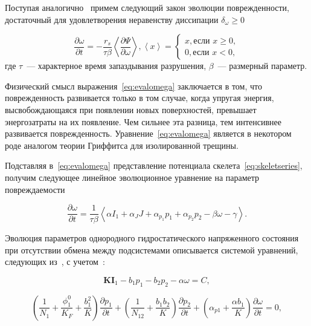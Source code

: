 Поступая аналогично~\autocite{kondaurov2007, izvekov2009, izvekov2010} примем следующий закон эволюции поврежденности, достаточный для удовлетворения неравенству диссипации $\delta_{\omega} \geq 0$

\begin{equation}
  \label{eq:evalomega}
  \frac{\partial \omega}{\partial t} = -\frac{r_s}{\tau \beta} \left\langle \frac{\partial \Psi}{\partial \omega} \right\rangle,
  \left\langle x \right\rangle =
  \begin{cases}
    x, \text{если } x \geqslant 0, \\
    0, \text{если } x<0,
  \end{cases}
\end{equation}
где $\tau$~--- характерное время запаздывания разрушения, $\beta$~--- размерный параметр.

Физический смысл выражения~\eqref{eq:evalomega} заключается в том, что поврежденность развивается только в том случае, когда упругая энергия, высвобождающаяся при появлении новых поверхностей, превышает энергозатраты на их появление. Чем сильнее эта разница, тем интенсивнее развивается поврежденность. Уравнение~\eqref{eq:evalomega} является в некотором роде аналогом теории Гриффитса для изолированной трещины.

Подставляя в~\eqref{eq:evalomega} представление потенциала скелета~\eqref{eq:skeletseries}, получим следующее линейное эволюционное уравнение на параметр повреждаемости

\begin{equation}
  \label{eq:evalomega1}
  \frac{\partial \omega}{\partial t} = \frac{1}{\tau \beta} \left\langle  \alpha I_1 + \alpha_J J + \alpha_{p_1} p_1 + \alpha_{p_2} p_2 -\beta \omega - \gamma \right\rangle.
\end{equation}

Эволюция параметров однородного гидростатического напряженного состояния при отсутствии обмена между подсистемами описывается системой уравнений, следующих из~, с учетом~:

\begin{equation}
  \label{eq:linequationskelet4}
  \textbf{K} \textbf{I}_1 - b_1 p_1 - b_2 p_2 - \alpha \omega = C,
\end{equation}

\begin{equation}
  \label{eq:linequationskelet5}
  \left( \frac{1}{N_1} + \frac{\phi_1^0}{K_F} + \frac{b_1^2}{K} \right) \frac{\partial p_1}{\partial t} + \left( \frac{1}{N_{12}} + \frac{b_1 b_2}{K} \right) \frac{\partial p_2}{\partial t} + \left( \alpha_{p1} + \frac{\alpha b_1}{K} \right) \frac{\partial \omega}{\partial t} = 0,
\end{equation}

